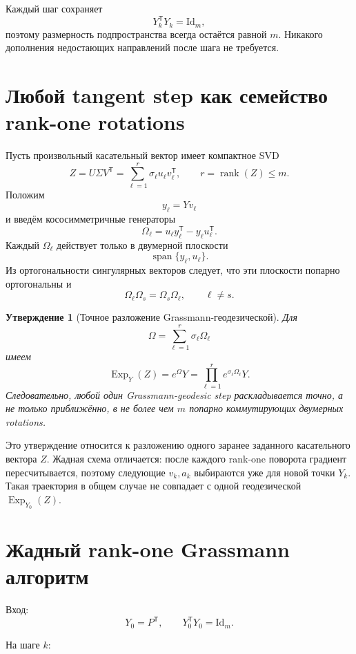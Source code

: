 \documentclass[11pt,a4paper]{article}
\newcommand{\T}{^{\mathsf T}}
\newcommand{\Id}{\mathrm{Id}}
\newcommand{\Exp}{\operatorname{Exp}}
\newcommand{\spanop}{\operatorname{span}}
\DeclareMathOperator{\rank}{rank}
\newtheorem{proposition}{Утверждение}
\begin{document}
Каждый шаг сохраняет
\[
    Y_k\T Y_k=\Id_m,
\]
поэтому размерность подпространства всегда остаётся равной \(m\).
Никакого дополнения недостающих направлений после шага не требуется.

\section{Любой tangent step как семейство rank-one rotations}

Пусть произвольный касательный вектор имеет компактное SVD
\[
    Z
    =
    U\Sigma V\T
    =
    \sum_{\ell=1}^r
    \sigma_\ell u_\ell v_\ell\T,
    \qquad
    r=\rank(Z)\le m.
\]
Положим
\[
    y_\ell=Yv_\ell
\]
и введём кососимметричные генераторы
\[
    \Omega_\ell
    =
    u_\ell y_\ell\T-y_\ell u_\ell\T.
\]
Каждый \(\Omega_\ell\) действует только в двумерной плоскости
\[
    \spanop\{y_\ell,u_\ell\}.
\]
Из ортогональности сингулярных векторов следует, что эти плоскости
попарно ортогональны и
\[
    \Omega_\ell\Omega_s
    =
    \Omega_s\Omega_\ell,
    \qquad
    \ell\ne s.
\]

\begin{proposition}[Точное разложение Grassmann-геодезической]
Для
\[
    \Omega
    =
    \sum_{\ell=1}^r
    \sigma_\ell\Omega_\ell
\]
имеем
\[
    \Exp_Y(Z)
    =
    e^\Omega Y
    =
    \prod_{\ell=1}^r
    e^{\sigma_\ell\Omega_\ell}Y.
\]
Следовательно, любой один Grassmann-geodesic step раскладывается
\emph{точно}, а не только приближённо, в не более чем \(m\)
попарно коммутирующих двумерных rotations.
\end{proposition}

Это утверждение относится к разложению одного заранее заданного
касательного вектора \(Z\). Жадная схема отличается: после каждого
rank-one поворота градиент пересчитывается, поэтому следующие
\(v_k,a_k\) выбираются уже для новой точки \(Y_k\). Такая траектория
в общем случае не совпадает с одной геодезической
\(\Exp_{Y_0}(Z)\).

\section{Жадный rank-one Grassmann алгоритм}

Вход:
\[
    Y_0=P\T,
    \qquad
    Y_0\T Y_0=\Id_m.
\]

На шаге \(k\):
\end{document}
